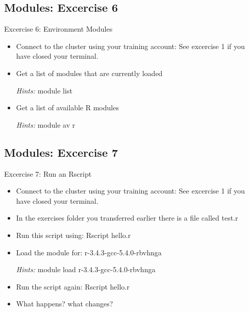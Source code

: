 \subsection{Modules: Excercise 6}
\begin{frame}[fragile]{Excercise 6: Environment Modules}
\begin{itemize}
\item{Connect to the cluster using your training account: See excercise 1 if you have closed your terminal. }
\item{Get a list of modules that are currently loaded}
\item[\emph{Hints:}]{\alert{module list}}
\item{Get a list of available R modules}
\item[\emph{Hints:}]{\alert{module av r}}
\end{itemize}
\end{frame}

\subsection{Modules: Excercise 7}
\begin{frame}[fragile]{Excercise 7: Run an Rscript}
\begin{itemize}
\item{Connect to the cluster using your training account: See excercise 1 if you have closed your terminal.}
\item{In the exercises folder you transferred earlier there is a file called test.r}
\item{Run this script using: Rscript hello.r }
\item{Load the module for: r-3.4.3-gcc-5.4.0-rbvhnga}
\item[\emph{Hints:}]{\alert{module load r-3.4.3-gcc-5.4.0-rbvhnga}}
\item{Run the script again: Rscript hello.r}
\item{What happens? what changes?}
\end{itemize}
\end{frame}

